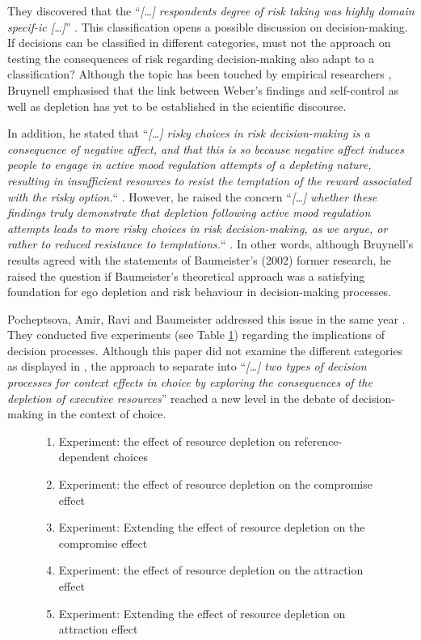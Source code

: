 They discovered that the “\emph{[\ldots] respondents degree of risk taking was highly domain specif-ic [\ldots]}” \citep[p.~263]{weber2002domain}. This classification opens a possible discussion on decision-making. If decisions can be classified in different categories, must not the approach on testing the consequences of risk regarding decision-making also adapt to a classification? Although the topic has been touched by empirical researchers \citep{ditto2006visceral}, Bruynell \citep{bruyneel2009felt} emphasised that the link between Weber’s findings and self-control as well as depletion has yet to be established in the scientific discourse.\par
In addition, he stated that “\emph{[\ldots] risky choices in risk decision-making is a consequence of negative affect, and that this is so because negative affect induces people to engage in active mood regulation attempts of a depleting nature, resulting in insufficient resources to resist the temptation of the reward associated with the risky option.}“ \citep[p.~165]{bruyneel2009felt}. However, he raised the concern “\emph{[\ldots] whether these findings truly demonstrate that depletion following active mood regulation attempts leads to more risky choices in risk decision-making, as we argue, or rather to reduced resistance to temptations.}“ \citep[p.~165]{bruyneel2009felt}. In other words, although Bruynell’s results agreed with the statements of Baumeister’s (2002) former research, he raised the question if Baumeister’s theoretical approach was a satisfying foundation for ego depletion and risk behaviour in decision-making processes.\par
Pocheptsova, Amir, Ravi and Baumeister addressed this issue in the same year \citep{pocheptsova2009deciding}. They conducted five experiments (see Table \ref{tab:fiveexp}) regarding the implications of decision processes. Although this paper did not examine the different categories as displayed in \citep{weber2002domain}, the approach to separate into “\emph{[\ldots] two types of decision processes for context effects in choice by exploring the consequences of the depletion of executive resources}” \citep{pocheptsova2009deciding} reached a new level in the debate of decision-making in the context of choice.
\begin{figure}[h!]
\begin{enumerate}
	\item Experiment: the effect of resource depletion on reference-dependent choices
	\item Experiment: the effect of resource depletion on the compromise effect
	\item Experiment: Extending the effect of resource depletion on the compromise effect
	\item Experiment: the effect of resource depletion on the attraction effect
	\item Experiment: Extending the effect of resource depletion on attraction effect
\label{tab:fiveexp}
\end{enumerate}
\end{figure}

